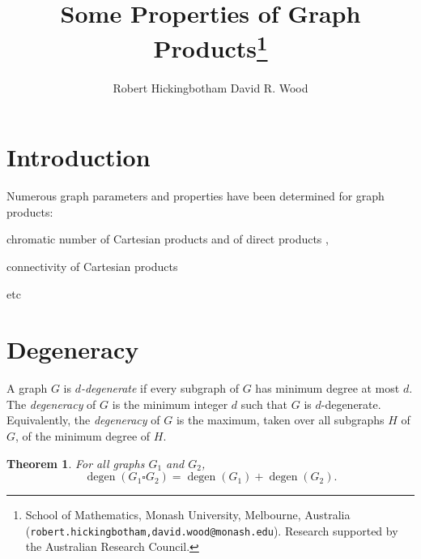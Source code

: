 \documentclass[a4paper,11pt]{article}
\title{\bf Some Properties of Graph Products\thanks{School of Mathematics, Monash University, Melbourne, Australia (\texttt{robert.hickingbotham,david.wood@monash.edu}). Research supported by the Australian Research Council.}}
\author{Robert Hickingbotham	\quad 	David R. Wood}
\theoremstyle{plain}
\newtheorem{thm}{Theorem}
\theoremstyle{definition}
\DeclareMathOperator{\degen}{degen}
\begin{document}
\maketitle

\begin{abstract}
\end{abstract}

\bigskip

\section{Introduction}

Numerous graph parameters and properties have been determined for graph products:

chromatic number of Cartesian products \citep{Sabidussi57} and of direct products \citep{???},

connectivity of Cartesian products \citep{???} 

etc



\section{Degeneracy}

A graph $G$ is \emph{$d$-degenerate} if every subgraph of $G$ has minimum degree at most $d$. The \emph{degeneracy} of $G$ is the minimum integer $d$ such that $G$ is $d$-degenerate. Equivalently, the \emph{degeneracy} of $G$ is the maximum, taken over all subgraphs $H$ of $G$, of the minimum degree of $H$. 

\begin{thm}
	For all graphs $G_1$ and $G_2$, $$\degen(G_1\square G_2)=\degen(G_1)+\degen(G_2).$$
\end{thm}
\end{document}
